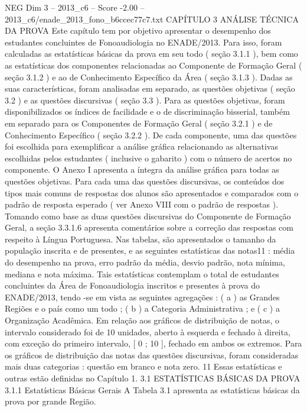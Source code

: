 \begin{textsample}{NEG Dim 3 – 2013\_c6 – Score -2.00 – 2013\_c6/enade\_2013\_fono\_b6ccec77c7.txt}  \label{ex:f3_neg_058}
CAPÍTULO 3 ANÁLISE TÉCNICA DA PROVA Este capítulo tem por objetivo apresentar o desempenho dos estudantes concluintes de Fonoaudiologia no ENADE/2013.
Para isso, foram calculadas as estatísticas básicas da prova em seu todo ( seção 3.1.1 ), bem como as estatísticas dos componentes relacionadas ao Componente de Formação Geral ( seção 3.1.2 ) e ao de Conhecimento Específico da Área ( seção 3.1.3 ).
Dadas as suas características, foram analisadas em separado, as questões objetivas ( seção 3.2 ) e as questões discursivas ( seção 3.3 ).
Para as questões objetivas, foram disponibilizados os índices de facilidade e o de discriminação bisserial, também em separado para os Componentes de Formação Geral ( seção 3.2.1 ) e de Conhecimento Específico ( seção 3.2.2 ).
De cada componente, uma das questões foi escolhida para exemplificar a análise gráfica relacionando as alternativas escolhidas pelos estudantes ( inclusive o gabarito ) com o número de acertos no componente.
O Anexo I apresenta a íntegra da análise gráfica para todas as questões objetivas.
Para cada uma das questões discursivas, os conteúdos dos tipos mais comuns de respostas dos alunos são apresentados e comparados com o padrão de resposta esperado ( ver Anexo VIII com o padrão de respostas ).
Tomando como base as duas questões discursivas do Componente de Formação Geral, a seção 3.3.1.6 apresenta comentários sobre a correção das respostas com respeito à Língua Portuguesa.
Nas tabelas, são apresentados o tamanho da população inscrita e de presentes, e as seguintes estatísticas das notas11 : média do desempenho na prova, erro padrão da média, desvio padrão, nota mínima, mediana e nota máxima.
Tais estatísticas contemplam o total de estudantes concluintes da Área de Fonoaudiologia inscritos e presentes à prova do ENADE/2013, tendo -se em vista as seguintes agregações : ( a ) as Grandes Regiões e o país como um todo ; ( b ) a Categoria Administrativa ; e ( c ) a Organização Acadêmica.
Em relação aos gráficos de distribuição de notas, o intervalo considerado foi de 10 unidades, aberto à esquerda e fechado à direita, com exceção do primeiro intervalo, [ 0 ; 10 ], fechado em ambos os extremos.
Para os gráficos de distribuição das notas das questões discursivas, foram consideradas mais duas categorias : questão em branco e nota zero. 11 Essas estatísticas e outras estão definidas no Capítulo 1. 3.1 ESTATÍSTICAS BÁSICAS DA PROVA 3.1.1 Estatísticas Básicas Gerais A Tabela 3.1 apresenta as estatísticas básicas da prova por grande Região.

\end{textsample}
